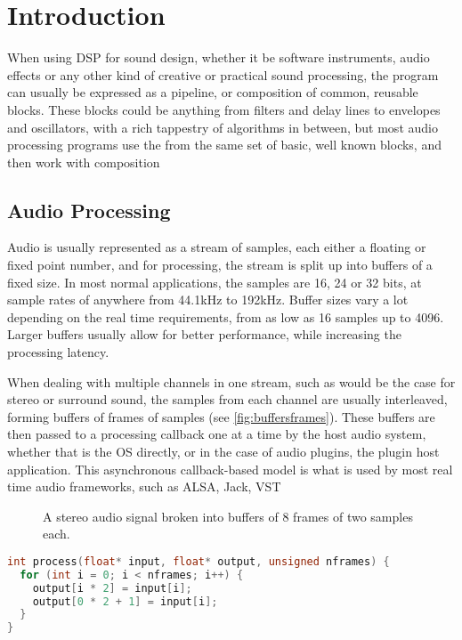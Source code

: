\chapter{Introduction}

When using DSP for sound design, whether it be software instruments, audio effects or any other kind of creative or
practical sound processing, the program can usually be expressed as a pipeline, or composition of common, reusable
blocks. These blocks could be anything from filters and delay lines to envelopes and oscillators, with a rich tappestry
of algorithms in between, but most audio processing programs use the from the same set of basic, well known blocks, and
then work with composition 

\section{Audio Processing}

Audio is usually represented as a stream of samples, each either a floating or fixed point number, and for processing,
the stream is split up into buffers of a fixed size. In most normal applications, the samples are 16, 24 or 32 bits, at
sample rates of anywhere from 44.1kHz to 192kHz. Buffer sizes vary a lot depending on the real time requirements, from
as low as 16 samples up to 4096. Larger buffers usually allow for better performance, while increasing the processing
latency.

When dealing with multiple channels in one stream, such as would be the case for stereo or surround sound, the samples
from each channel are usually interleaved, forming buffers of frames of samples (see \autoref{fig:buffersframes}).
These buffers are then passed to a processing callback one at a time by the host audio system, whether that is the OS
directly, or in the case of audio plugins, the plugin host application. This asynchronous callback-based model is what
is used by most real time audio frameworks, such as ALSA, Jack, VST

\begin{figure}
  
  \caption{A stereo audio signal broken into buffers of 8 frames of two samples each.}
  \label{fig:buffersframes}
\end{figure}

\begin{lstlisting}[language=c++,label=lst:jackmerge,float,caption={
    An example process function that sends one input channel to two output channels. Numbers of channels are determined before registering the process function.
}]
int process(float* input, float* output, unsigned nframes) {
  for (int i = 0; i < nframes; i++) {
    output[i * 2] = input[i];
    output[0 * 2 + 1] = input[i];
  }
}
\end{lstlisting}

